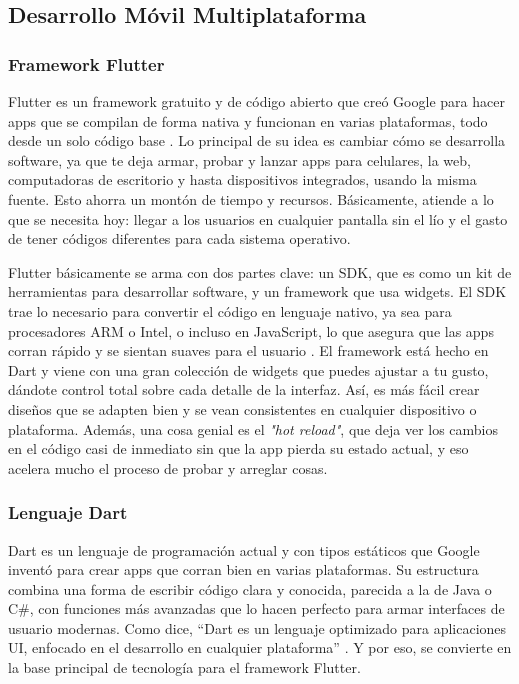 \subsection{Desarrollo Móvil Multiplataforma}

\subsubsection{Framework Flutter}
Flutter es un framework gratuito y de código abierto que creó Google para hacer apps que se compilan de forma nativa y funcionan en varias plataformas, todo desde un solo código base \cite{FlutterDocES}. Lo principal de su idea es cambiar cómo se desarrolla software, ya que te deja armar, probar y lanzar apps para celulares, la web, computadoras de escritorio y hasta dispositivos integrados, usando la misma fuente. Esto ahorra un montón de tiempo y recursos. Básicamente, atiende a lo que se necesita hoy: llegar a los usuarios en cualquier pantalla sin el lío y el gasto de tener códigos diferentes para cada sistema operativo.

Flutter básicamente se arma con dos partes clave: un SDK, que es como un kit de herramientas para desarrollar software, y un framework que usa widgets. El SDK trae lo necesario para convertir el código en lenguaje nativo, ya sea para procesadores ARM o Intel, o incluso en JavaScript, lo que asegura que las apps corran rápido y se sientan suaves para el usuario \cite{FlutterStudyDocker}. El framework está hecho en Dart y viene con una gran colección de widgets que puedes ajustar a tu gusto, dándote control total sobre cada detalle de la interfaz. Así, es más fácil crear diseños que se adapten bien y se vean consistentes en cualquier dispositivo o plataforma. Además, una cosa genial es el \textit{"hot reload"}, que deja ver los cambios en el código casi de inmediato sin que la app pierda su estado actual, y eso acelera mucho el proceso de probar y arreglar cosas.

\subsubsection{Lenguaje Dart}
Dart es un lenguaje de programación actual y con tipos estáticos que Google inventó para crear apps que corran bien en varias plataformas. Su estructura combina una forma de escribir código clara y conocida, parecida a la de Java o C\#, con funciones más avanzadas que lo hacen perfecto para armar interfaces de usuario modernas. Como dice, “Dart es un lenguaje optimizado para aplicaciones UI, enfocado en el desarrollo en cualquier plataforma” \cite{DartWiki2024}. Y por eso, se convierte en la base principal de tecnología para el framework Flutter.

